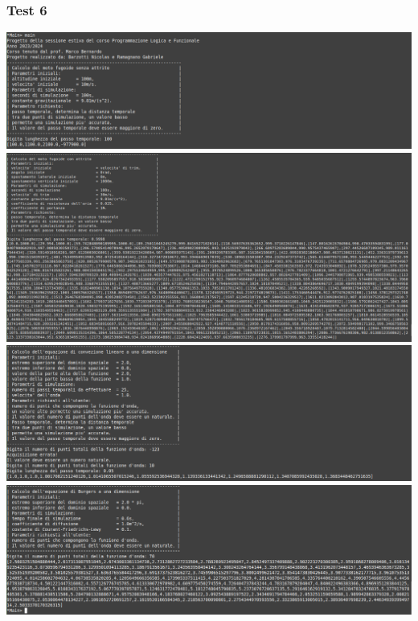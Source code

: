 \subsubsection*{Test 6}
\includegraphics[width=\textwidth,height=\textheight,keepaspectratio]{05_testing/image/hs/06_test/01_misto.png}
\\
\includegraphics[width=\textwidth,height=\textheight,keepaspectratio]{05_testing/image/hs/06_test/02_misto.png}
\\
\includegraphics[width=\textwidth,height=\textheight,keepaspectratio]{05_testing/image/hs/06_test/03_misto.png}
\\
\includegraphics[width=\textwidth,height=\textheight,keepaspectratio]{05_testing/image/hs/06_test/04_misto.png}


